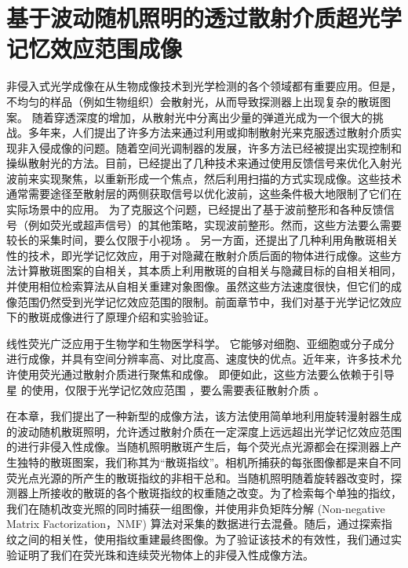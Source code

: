 
\chapter{基于波动随机照明的透过散射介质超光学记忆效应范围成像}\label{chap:5}

非侵入式光学成像在从生物成像技术\cite{zhao_non-invasive_2001,artzi_vivo_2011}到光学检测\cite{kozloff_non-invasive_2009}的各个领域都有重要应用。但是，不均匀的样品（例如生物组织）会散射光，从而导致探测器上出现复杂的散斑图案\cite{Goodman1976,Bender}。
随着穿透深度的增加，从散射光中分离出少量的弹道光成为一个很大的挑战\cite{Abramson1978,huang_optical_1991}。多年来，人们提出了许多方法来通过利用或抑制散射光来克服透过散射介质实现非入侵成像的问题。随着空间光调制器的发展，许多方法已经被提出实现控制和操纵散射光的方法\cite{Mosk2012,rotter_light_2017}。目前，已经提出了几种技术来通过使用反馈信号来优化入射光波前来实现聚焦，以重新形成一个焦点，然后利用扫描的方式实现成像\cite{Vellekoop2007,Horstmeyer2015}。这些技术通常需要途径至散射层的两侧获取信号以优化波前，这些条件极大地限制了它们在实际场景中的应用。
为了克服这个问题，已经提出了基于波前整形和各种反馈信号（例如荧光或超声信号）的其他策略\cite{Horstmeyer2015,Katz2019,Popoff2010,Hofer2019}，实现波前整形。然而，这些方法要么需要较长的采集时间，要么仅限于小视场 。
另一方面，还提出了几种利用角散斑相关性的技术\cite{bertolotti_non-invasive_2012,katz_non-invasive_2014}，即光学记忆效应\cite{Freund1988,Yllmaz2019,Osnabrugge}，用于对隐藏在散射介质后面的物体进行成像。这些方法计算散斑图案的自相关，其本质上利用散斑的自相关与隐藏目标的自相关相同，并使用相位检索算法从自相关重建对象图像。虽然这些方法速度很快，但它们的成像范围仍然受到光学记忆效应范围的限制。前面章节中，我们对基于光学记忆效应下的散斑成像进行了原理介绍和实验验证。

线性荧光广泛应用于生物学和生物医学科学\cite{Ruan2020,Lichtman2005,mangeat_super_resolved_2021}。 它能够对细胞、亚细胞或分子成分进行成像，并具有空间分辨率高、对比度高、速度快的优点。近年来，许多技术允许使用荧光通过散射介质进行聚焦和成像。
即便如此，这些方法要么依赖于引导星 \cite{Hhorstmeyer} 的使用，仅限于光学记忆效应范围 \cite{hofer_wide_2018}，要么需要表征散射介质 \cite{boniface_non_invasive_2020}。

在本章，我们提出了一种新型的成像方法，该方法使用简单地利用旋转漫射器生成的波动随机散斑照明，允许透过散射介质在一定深度上远远超出光学记忆效应范围的进行非侵入性成像。当随机照明散斑产生后，每个荧光点光源都会在探测器上产生独特的散斑图案，我们称其为“散斑指纹”。相机所捕获的每张图像都是来自不同荧光点光源的所产生的散斑指纹的非相干总和。当随机照明随着旋转器改变时，探测器上所接收的散斑的各个散斑指纹的权重随之改变。为了检索每个单独的指纹，我们在随机改变光照的同时捕获一组图像，并使用非负矩阵分解 (Non-negative Matrix Factorization，NMF) 算法对采集的数据进行去混叠。随后，通过探索指纹之间的相关性，使用指纹重建最终图像。为了验证该技术的有效性，我们通过实验证明了我们在荧光珠和连续荧光物体上的非侵入性成像方法。

